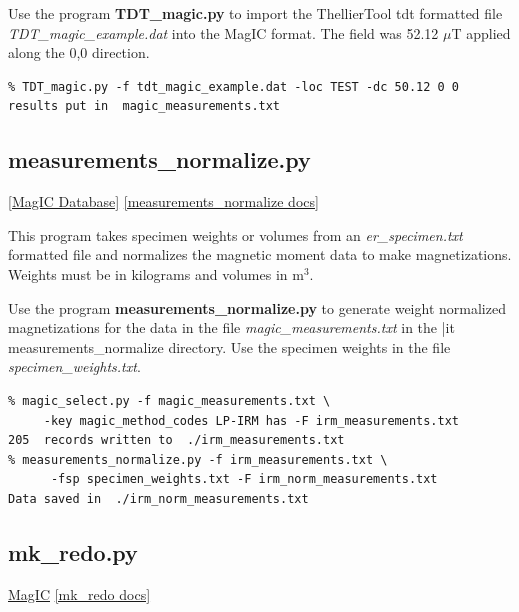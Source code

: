 \documentclass[11pt]{book}
\begin{document}
{{Use the program {\bf TDT\_magic.py} to import the ThellierTool tdt formatted file  {\it TDT\_magic\_example.dat} into the MagIC format.   The field was 52.12 $\mu$T applied along the 0,0 direction.

\begin{verbatim}
% TDT_magic.py -f tdt_magic_example.dat -loc TEST -dc 50.12 0 0
results put in  magic_measurements.txt
\end{verbatim}


\subsection{measurements\_normalize.py}
\href{#MagICDatabase}{[MagIC Database]}
\href{https://github.com/PmagPy/PmagPy/blob/master/programs/measurements_normalize.py}{[measurements\_normalize docs]}

This program takes specimen weights or volumes from an {\it er\_specimen.txt} formatted file and normalizes the magnetic moment data to make  magnetizations.  Weights must be in kilograms and volumes in m$^3$.

Use the program {\bf measurements\_normalize.py} to generate weight normalized magnetizations for the data in the file {\it magic\_measurements.txt} in the {|it measurements\_normalize} directory.  Use the specimen weights in the file {\it specimen\_weights.txt}.

\begin{verbatim}
% magic_select.py -f magic_measurements.txt \
     -key magic_method_codes LP-IRM has -F irm_measurements.txt
205  records written to  ./irm_measurements.txt
% measurements_normalize.py -f irm_measurements.txt \
      -fsp specimen_weights.txt -F irm_norm_measurements.txt
Data saved in  ./irm_norm_measurements.txt
\end{verbatim}

\subsection{mk\_redo.py}
\href{#MagIC}{MagIC}
\href{https://github.com/PmagPy/PmagPy/blob/master/programs/mk_redo.py}{[mk\_redo docs]}

}}
\end{document}
